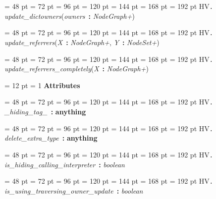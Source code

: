 {{{{\par \noindent  \leftskip = 48 pt  \leftmargini = 72 pt  \leftmarginii = 96 pt  \leftmarginiii = 120 pt  \leftmarginiv = 144 pt  \leftmarginv = 168 pt  \leftmarginvi = 192 pt HV{\large {\tt .\/} {\em update{\_}dictowners\/}}({\em owners\/}~{\bf :}  {\em NodeGraph+\/})\par}
{\par \noindent  \leftskip = 48 pt  \leftmargini = 72 pt  \leftmarginii = 96 pt  \leftmarginiii = 120 pt  \leftmarginiv = 144 pt  \leftmarginv = 168 pt  \leftmarginvi = 192 pt HV{\large {\tt .\/} {\em update{\_}referrers\/}}({\em X\/}~{\bf :}  {\em NodeGraph+\/}, {\em Y\/}~{\bf :}  {\em NodeSet+\/})\par}
{\par \noindent  \leftskip = 48 pt  \leftmargini = 72 pt  \leftmarginii = 96 pt  \leftmarginiii = 120 pt  \leftmarginiv = 144 pt  \leftmarginv = 168 pt  \leftmarginvi = 192 pt HV{\large {\tt .\/} {\em update{\_}referrers{\_}completely\/}}({\em X\/}~{\bf :}  {\em NodeGraph+\/})\par}
{\par \pagebreak[3.200000] \noindent \hangindent = 12 pt \hangafter = 1 
{\bf {\large {\bf Attributes\/}}\/}\par}
{\par \noindent  \leftskip = 48 pt  \leftmargini = 72 pt  \leftmarginii = 96 pt  \leftmarginiii = 120 pt  \leftmarginiv = 144 pt  \leftmarginv = 168 pt  \leftmarginvi = 192 pt HV{\large {\tt .\/} {\em {\_}hiding{\_}tag{\_}\/}}~{\bf :} {\bf  anything\/}\par}
{\par \noindent  \leftskip = 48 pt  \leftmargini = 72 pt  \leftmarginii = 96 pt  \leftmarginiii = 120 pt  \leftmarginiv = 144 pt  \leftmarginv = 168 pt  \leftmarginvi = 192 pt HV{\large {\tt .\/} {\em delete{\_}extra{\_}type\/}}~{\bf :} {\bf  anything\/}\par}
{\par \noindent  \leftskip = 48 pt  \leftmargini = 72 pt  \leftmarginii = 96 pt  \leftmarginiii = 120 pt  \leftmarginiv = 144 pt  \leftmarginv = 168 pt  \leftmarginvi = 192 pt HV{\large {\tt .\/} {\em is{\_}hiding{\_}calling{\_}interpreter\/}}~{\bf :}  {\em boolean\/}\par}
{\par \noindent  \leftskip = 48 pt  \leftmargini = 72 pt  \leftmarginii = 96 pt  \leftmarginiii = 120 pt  \leftmarginiv = 144 pt  \leftmarginv = 168 pt  \leftmarginvi = 192 pt HV{\large {\tt .\/} {\em is{\_}using{\_}traversing{\_}owner{\_}update\/}}~{\bf :}  {\em boolean\/}\par}
}}}
